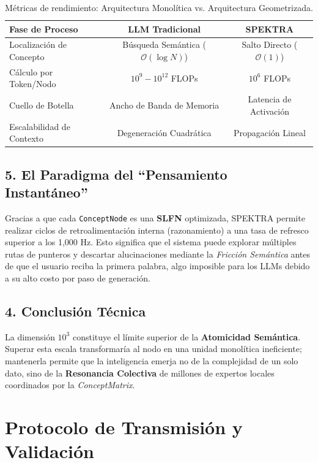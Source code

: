 \documentclass[12pt]{article}
\begin{document}
\begin{table}[h]
	\centering
	\begin{tabular}{|l|c|c|}
		\hline
		\textbf{Fase de Proceso} & \textbf{LLM Tradicional} & \textbf{SPEKTRA} \\ \hline
		Localización de Concepto & Búsqueda Semántica ($\mathcal{O}(\log N)$) & Salto Directo ($\mathcal{O}(1)$) \\ \hline
		Cálculo por Token/Nodo & $10^9 - 10^{12}$ FLOPs & $10^6$ FLOPs \\ \hline
		Cuello de Botella & Ancho de Banda de Memoria & Latencia de Activación \\ \hline
		Escalabilidad de Contexto & Degeneración Cuadrática & Propagación Lineal \\ \hline
	\end{tabular}
	\caption{Métricas de rendimiento: Arquitectura Monolítica vs. Arquitectura Geometrizada.}
\end{table}



\subsection{5. El Paradigma del ``Pensamiento Instantáneo''}
Gracias a que cada \texttt{ConceptNode} es una \textbf{SLFN} optimizada, SPEKTRA permite realizar ciclos de retroalimentación interna (razonamiento) a una tasa de refresco superior a los 1,000 Hz. Esto significa que el sistema puede explorar múltiples rutas de punteros y descartar alucinaciones mediante la \textit{Fricción Semántica} antes de que el usuario reciba la primera palabra, algo imposible para los LLMs debido a su alto costo por paso de generación.


\subsection{4. Conclusión Técnica}
La dimensión $10^3$ constituye el límite superior de la \textbf{Atomicidad Semántica}. Superar esta escala transformaría al nodo en una unidad monolítica ineficiente; mantenerla permite que la inteligencia emerja no de la complejidad de un solo dato, sino de la \textbf{Resonancia Colectiva} de millones de expertos locales coordinados por la \textit{ConceptMatrix}.

\section{Protocolo de Transmisión y Validación}
\end{document}
